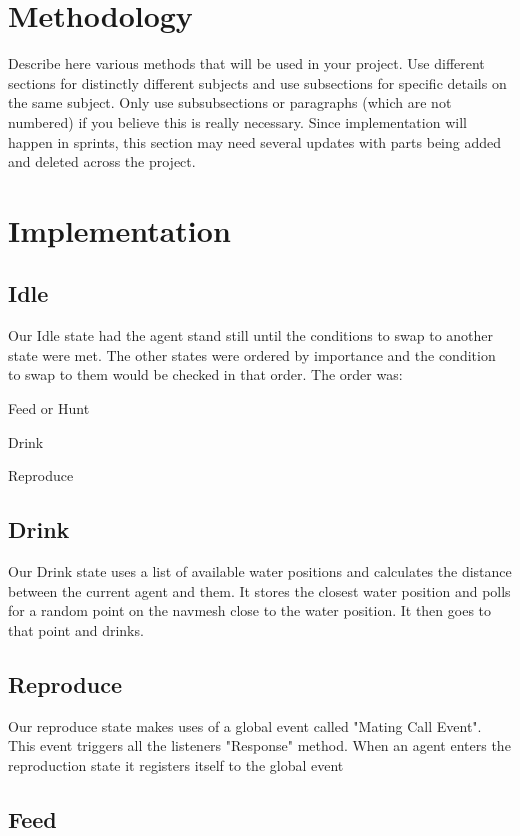 \documentclass[a4paper, oneside, 11pt]{report}
\begin{document}
\chapter{Methodology}\label{MethLab}


Describe here various methods that will be used in your project. Use different sections for distinctly different subjects and use subsections for specific details on the same subject. Only use subsubsections or paragraphs (which are not numbered) if you believe this is really necessary. Since implementation will happen in sprints, this section may need several updates with parts being added and deleted across the project.


\chapter{Implementation}\label{Impl}

\section{Idle}
	Our Idle state had the agent stand still until the conditions to swap to another state were met. The other states were ordered by importance and the condition to swap to them would be checked in that order. The order was:
	\begin{Enumerate}
		\item{Feed or Hunt}
		\item{Drink}
		\item{Reproduce}
	\end{Enumerate}
\section{Drink}
	Our Drink state uses a list of available water positions and calculates the distance between the current agent and them. It stores the closest water position and polls for a random point on the navmesh close to the water position. It then goes to that point and drinks.
\section{Reproduce}
	Our reproduce state makes uses of a global event called "Mating Call Event". This event triggers all the listeners "Response" method. When an agent enters the reproduction state it registers itself to the global event
\section{Feed}
\end{document}
